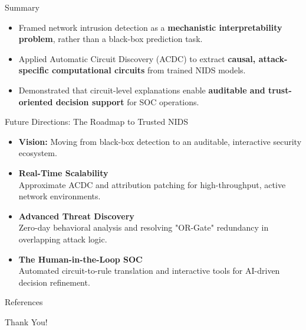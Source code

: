 \documentclass{beamer}
\begin{document}
	\begin{frame}{Summary}
		\begin{itemize}
			\justifying
			\item \justifying Framed network intrusion detection as a
			\textbf{mechanistic interpretability problem}, rather than a black-box
			prediction task.
			
			\item \justifying Applied Automatic Circuit Discovery (ACDC) to extract
			\textbf{causal, attack-specific computational circuits} from trained NIDS
			models.
			
			\item \justifying Demonstrated that circuit-level explanations enable
			\textbf{auditable and trust-oriented decision support} for SOC operations.
		\end{itemize}
	\end{frame}
	
	
	\begin{frame}{Future Directions: The Roadmap to Trusted NIDS}
		\begin{itemize}
			\item \textbf{Vision:} Moving from black-box detection to an auditable, interactive security ecosystem.
			
			\vspace{1em}
			
			\item \textbf{Real-Time Scalability} \\
			Approximate ACDC and attribution patching for high-throughput, active network environments.
			
			\vspace{0.8em}
			
			\item \textbf{Advanced Threat Discovery} \\
			Zero-day behavioral analysis and resolving "OR-Gate" redundancy in overlapping attack logic.
			
			\vspace{0.8em}
			
			\item \textbf{The Human-in-the-Loop SOC} \\
			Automated circuit-to-rule translation and interactive tools for AI-driven decision refinement.
		\end{itemize}
	\end{frame}
	
	\begin{frame}{References}
		\justifying
		\printbibliography
	\end{frame}
	
	\begin{frame}
		\centering
		\Large Thank You!
	\end{frame}
	
\end{document}

